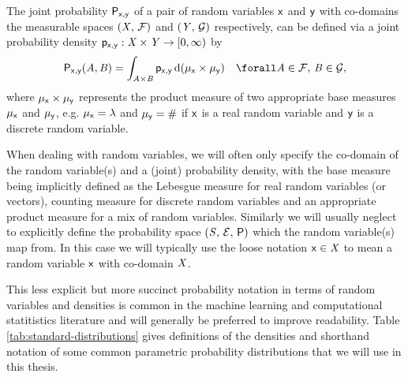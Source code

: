 The joint probability $\mathsf{P}_{\mathsf{x},\mathsf{y}}$ of a pair of random variables $\mathsf{x}$ and $\mathsf{y}$ with co-domains the measurable spaces $(\mathit{X},\,\mathcal{F})$ and $(\mathit{Y},\,\mathcal{G})$ respectively, can be defined via a joint probability density $\mathsf{p}_{\mathsf{x},\mathsf{y}} : \mathit{X} \times \mathit{Y} \to [0,\infty)$ by
\begin{equation}\label{eq:real-rv-joint-prob-dens}
  \prob{\rvar{x},\rvar{y}}(\set{A},\set{B}) =
  \int_{\set{A}\times\set{B}} 
    \pden{\rvar{x},\rvar{y}} 
  \,\dr(\mu_{\rvar{x}} \times \mu_{\rvar{y}})
  \quad \forall \set{A} \in \sset{F}, \,\set{B} \in \sset{G},
\end{equation}
where $\mu_{\mathsf{x}} \times \mu_{\mathsf{y}}$ represents the product measure of two appropriate base measures $\mu_{\mathsf{x}}$ and $\mu_{\mathsf{y}}$, e.g. $\mu_{\rvar{x}} = \lebm{1}$ and $\mu_{\mathsf{y}} = \#$ if $\mathsf{x}$ is a real random variable and $\mathsf{y}$ is a discrete random variable.

When dealing with random variables, we will often only specify the co-domain of the random variable(s) and a (joint) probability density, with the base measure being implicitly defined as the Lebesgue measure for real random variables (or vectors), counting measure for discrete random variables and an appropriate product measure for a mix of random variables. Similarly we will usually neglect to explicitly define the probability space $(\mathit{S},\,\mathcal{E},\,\mathsf{P})$ which the random variable(s) map from. In this case we will typically use the loose notation $\mathsf{x} \in \mathit{X}$ to mean a random variable $\mathsf{x}$ with co-domain $\mathit{X}$. 

This less explicit but more succinct probability notation in terms of random variables and densities is common in the machine learning and computational statitistics literature and will generally be preferred to improve readability. 
Table \ref{tab:standard-distributions} gives definitions of the densities and shorthand notation of some common parametric probability distributions that we will use in this thesis.

